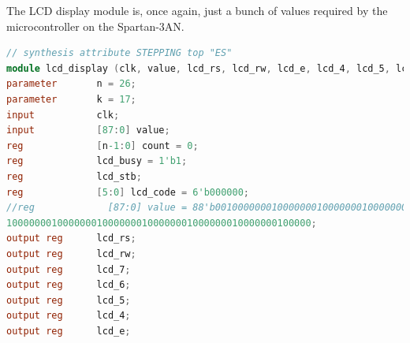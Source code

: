 \documentclass[12pt,a4paper,hidelinks]{article}            %
\begin{document}
The LCD display module is, once again, just a bunch of values required by the microcontroller on the Spartan-3AN. 

\begin{lstlisting}[language=Verilog]
// synthesis attribute STEPPING top "ES"
module lcd_display (clk, value, lcd_rs, lcd_rw, lcd_e, lcd_4, lcd_5, lcd_6, lcd_7);
parameter       n = 26;
parameter       k = 17;
input           clk;
input           [87:0] value;
reg             [n-1:0] count = 0;
reg             lcd_busy = 1'b1;
reg             lcd_stb;
reg             [5:0] lcd_code = 6'b000000;
//reg             [87:0] value = 88'b0010000000100000001000000010000000
100000001000000010000000100000001000000010000000100000;
output reg      lcd_rs;
output reg      lcd_rw;
output reg      lcd_7;
output reg      lcd_6;
output reg      lcd_5;
output reg      lcd_4;
output reg      lcd_e;



\end{lstlisting}
\end{document}
